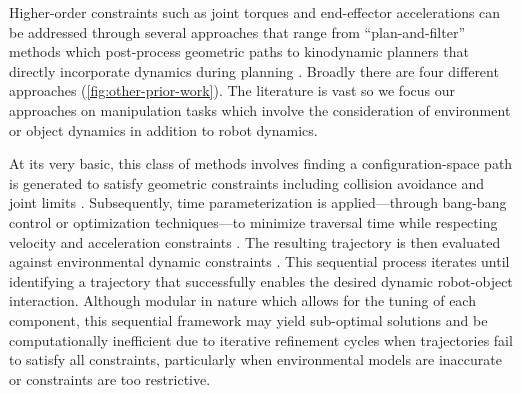 Higher-order constraints such as joint torques and end-effector accelerations can be addressed through several approaches that range from ``plan-and-filter'' methods which post-process geometric paths \cite{abderezaei2024clutter,kuntz2019fast} to kinodynamic planners that directly incorporate dynamics during planning \cite{li2016asymptotically,nayak2022bidirectional}.
Broadly there are four different approaches (\cref{fig:other-prior-work}). The literature is vast so we focus our approaches on manipulation tasks which involve the consideration of environment or object dynamics in addition to robot dynamics.






At its very basic, this class of methods involves finding a configuration-space path is generated to satisfy geometric constraints including collision avoidance and joint limits \cite{orthey2023sampling}. Subsequently, time parameterization is applied---through bang-bang control or optimization techniques---to minimize traversal time while respecting velocity and acceleration constraints \cite{pham2018new,berscheid2021jerk}. The resulting trajectory is then evaluated against environmental dynamic constraints \cite{gaz2019dynamic}. This sequential process iterates until identifying a trajectory that successfully enables the desired dynamic robot-object interaction.
Although modular in nature which allows for the tuning of each component, this sequential framework may yield sub-optimal solutions and be computationally inefficient due to iterative refinement cycles when trajectories fail to satisfy all constraints, particularly when environmental models are inaccurate or constraints are too restrictive.

